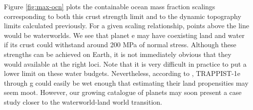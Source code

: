 \documentclass[trackchanges]{aastex63}
\newcommand{\todo}[1]{\textit{\textcolor{violet}{{#1}}}}
\begin{document}





Figure \ref{fig:max-ocn} plots the containable ocean mass fraction scalings corresponding to both this crust strength limit and to the dynamic topography limits calculated previously. For a given scaling relationship, points above the line would be waterworlds. We see that planet e may have coexisting land and water if its crust could withstand around 200 MPa of normal stress. Although these strengths can be achieved on Earth, it is not immediately obvious that they would available at the right loci.
Note that it is very difficult in practice to put a lower limit on these water budgets. Nevertheless, according to \citet{agol_refining_2021}, TRAPPIST-1e through g could easily be wet enough that estimating their land propensities may seem moot. However, our growing catalogue of planets may soon present a case study closer to the waterworld-land world transition. %
\end{document}
